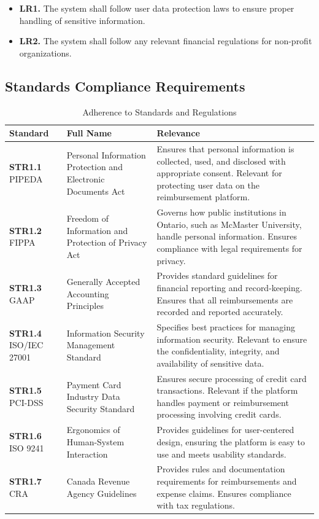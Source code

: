 \documentclass[12pt]{article}
\begin{document}
\begin{itemize}
    \item \textbf{LR1.} The system shall follow user data protection laws to ensure proper handling of sensitive information.
    \item \textbf{LR2.} The system shall follow any relevant financial regulations for non-profit organizations.
\end{itemize}
\subsection{Standards Compliance Requirements}

\label{STR}
\begin{table}[H]
    \centering
    \begin{tabular}{|>{\raggedright}p{3cm}|>{\raggedright}p{5cm}|>{\raggedright\arraybackslash}p{6.5cm}|}
        \hline
        \textbf{Standard} & \textbf{Full Name} & \textbf{Relevance} \\
        \hline
        \textbf{STR1.1} PIPEDA & Personal Information Protection and Electronic Documents Act & Ensures that personal information is collected, used, and disclosed with appropriate consent. Relevant for protecting user data on the reimbursement platform. \\
        \hline
        \textbf{STR1.2} FIPPA & Freedom of Information and Protection of Privacy Act & Governs how public institutions in Ontario, such as McMaster University, handle personal information. Ensures compliance with legal requirements for privacy. \\
        \hline
        \textbf{STR1.3} GAAP & Generally Accepted Accounting Principles & Provides standard guidelines for financial reporting and record-keeping. Ensures that all reimbursements are recorded and reported accurately. \\
        \hline
        \textbf{STR1.4} ISO/IEC 27001 & Information Security Management Standard & Specifies best practices for managing information security. Relevant to ensure the confidentiality, integrity, and availability of sensitive data. \\
        \hline
        \textbf{STR1.5} PCI-DSS & Payment Card Industry Data Security Standard & Ensures secure processing of credit card transactions. Relevant if the platform handles payment or reimbursement processing involving credit cards. \\
        \hline
        \textbf{STR1.6} ISO 9241 & Ergonomics of Human-System Interaction & Provides guidelines for user-centered design, ensuring the platform is easy to use and meets usability standards. \\
        \hline
        \textbf{STR1.7} CRA & Canada Revenue Agency Guidelines & Provides rules and documentation requirements for reimbursements and expense claims. Ensures compliance with tax regulations. \\
        \hline
    \end{tabular}
    \caption{Adherence to Standards and Regulations}
    \label{tab:standards}
\end{table}
\end{document}
